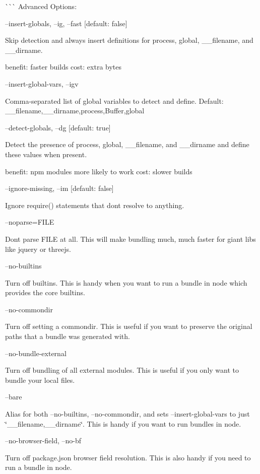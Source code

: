 \`{}\`{}\`{} Advanced Options\+:

--insert-\/globals, --ig, --fast \mbox{[}default\+: false\mbox{]}

Skip detection and always insert definitions for process, global, \+\_\+\+\_\+filename, and \+\_\+\+\_\+dirname.

benefit\+: faster builds cost\+: extra bytes

--insert-\/global-\/vars, --igv

Comma-\/separated list of global variables to detect and define. Default\+: \+\_\+\+\_\+filename,\+\_\+\+\_\+dirname,process,Buffer,global

--detect-\/globals, --dg \mbox{[}default\+: true\mbox{]}

Detect the presence of process, global, \+\_\+\+\_\+filename, and \+\_\+\+\_\+dirname and define these values when present.

benefit\+: npm modules more likely to work cost\+: slower builds

--ignore-\/missing, --im \mbox{[}default\+: false\mbox{]}

Ignore {\ttfamily require()} statements that don\textquotesingle{}t resolve to anything.

--noparse=F\+I\+LE

Don\textquotesingle{}t parse F\+I\+LE at all. This will make bundling much, much faster for giant libs like jquery or threejs.

--no-\/builtins

Turn off builtins. This is handy when you want to run a bundle in node which provides the core builtins.

--no-\/commondir

Turn off setting a commondir. This is useful if you want to preserve the original paths that a bundle was generated with.

--no-\/bundle-\/external

Turn off bundling of all external modules. This is useful if you only want to bundle your local files.

--bare

Alias for both --no-\/builtins, --no-\/commondir, and sets --insert-\/global-\/vars to just \char`\"{}\+\_\+\+\_\+filename,\+\_\+\+\_\+dirname\char`\"{}. This is handy if you want to run bundles in node.

--no-\/browser-\/field, --no-\/bf

Turn off package.\+json browser field resolution. This is also handy if you need to run a bundle in node.

